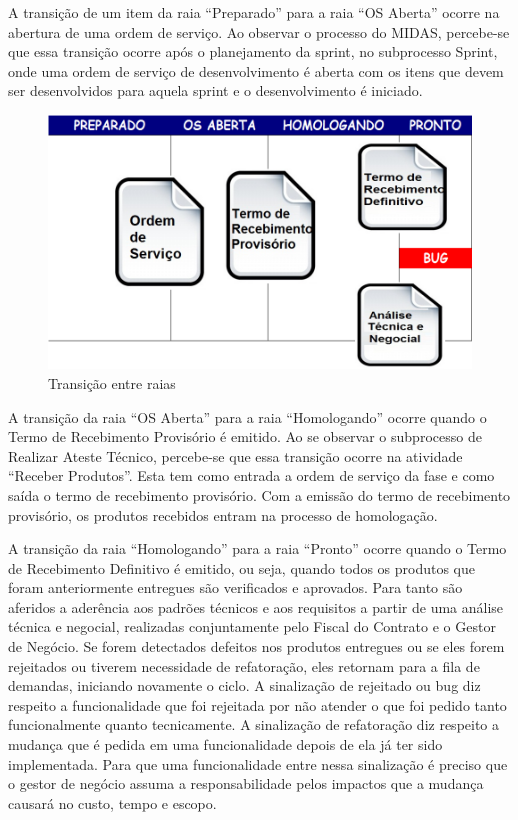 A transição de um item da raia “Preparado” para a raia “OS Aberta” ocorre na abertura de uma ordem de serviço. Ao observar o processo do MIDAS, percebe-se que essa transição ocorre após o planejamento da sprint, no subprocesso Sprint, onde uma ordem de serviço de desenvolvimento é aberta  com os itens que devem ser desenvolvidos para aquela sprint e o desenvolvimento é iniciado. 

\begin{figure}[H]
		\centering
		\label{fig07}
			\includegraphics[scale=0.5]{figuras/kanbanIPHAN3.png}
		\caption{Transição entre raias \cite{parente}}
\end{figure}

A transição da raia “OS Aberta” para a raia “Homologando” ocorre quando o Termo de Recebimento Provisório é emitido. Ao se observar o subprocesso de Realizar Ateste Técnico, percebe-se que essa transição ocorre na atividade “Receber Produtos”. Esta tem como entrada a ordem de serviço da fase e como saída o termo de recebimento provisório. Com a emissão do termo de recebimento provisório, os produtos recebidos entram na processo de homologação. 

A transição da raia “Homologando” para a raia “Pronto” ocorre quando o Termo de Recebimento Definitivo é emitido, ou seja, quando todos os produtos que foram anteriormente entregues são verificados e aprovados. Para tanto são aferidos a aderência aos padrões técnicos e aos requisitos a partir de uma análise técnica e negocial, realizadas conjuntamente pelo Fiscal do Contrato e o Gestor de Negócio. Se forem detectados defeitos nos produtos entregues ou se eles forem rejeitados ou tiverem necessidade de refatoração, eles retornam para a fila de demandas, iniciando novamente o ciclo. A sinalização de rejeitado ou bug diz respeito a funcionalidade que foi rejeitada por não atender o que foi pedido tanto funcionalmente quanto tecnicamente. A sinalização de refatoração diz respeito a mudança que é pedida em uma funcionalidade depois de ela já ter sido implementada. Para que uma funcionalidade entre nessa sinalização é preciso que o gestor de negócio assuma a responsabilidade pelos impactos que a mudança causará no custo, tempo e escopo.

